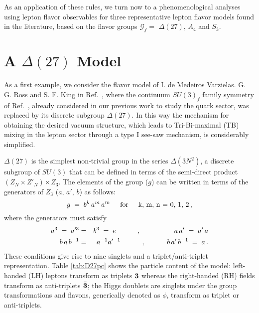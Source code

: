 \documentclass[a4paper,11pt]{article}
\newcommand{\bea}{\begin{eqnarray}}
\newcommand{\beq}{\begin{equation}}
\newcommand{\eea}{\end{eqnarray}}
\newcommand{\eeq}{\end{equation}}
\newcommand{\nn}{\nonumber}
\begin{document}
As an application of these rules, we turn now to a phenomenological analyses using lepton flavor observables for three representative lepton flavor models found in the literature, based on the flavor groups $\mathcal{G}_f = $ $\Delta(27)$, $A_4$ and $S_3$.


\section{A $\Delta (27)$ Model} \label{del27model}

As a first example, we consider the flavor model of I. de Medeiros Varzielas. G. G. Ross and S. F. King in Ref.~\cite{deMedeirosVarzielas:2006fc}, where the continuum $SU(3)_f$ family symmetry of Ref.~\cite{deMedeirosVarzielas:2005ax}, already considered in our previous work to study the quark sector, was replaced by its discrete subgroup $\Delta(27)$. In this way the mechanism for obtaining the desired vacuum structure, which leads to  Tri-Bi-maximal (TB) mixing in the lepton sector through a type I see-saw mechanism, is considerably simplified.

$\Delta(27)$ is the simplest non-trivial group in the series $\Delta(3N^2)$, a discrete subgroup of $SU(3)$ that can be defined in terms of the semi-direct product $(Z_N\times Z'_N)\ltimes Z_3$. The elements of the group ($g$) can be written in terms of the generators of $Z_3$ ($a$, $a'$, $b$) as follows:
\beq
g \;=\; b^k\, a^m\, a'^n \hspace{0.5cm}{\rm for}\hspace{0.5cm} \mbox{k, m, n = 0, 1, 2}\, ,
\eeq
where the generators must satisfy
\bea
 a^3 \;=\; a'^3 & = & b^3 \;=\; e \hspace{1cm}\;,\;\hspace{1.6cm} a\,a' \;=\; a'\,a \nn \\
b\,a\,b^{-1} & = & a^{-1}a'^{-1} \hspace{1cm}\;,\;\hspace{1cm} b\,a'\,b^{-1} \;=\; a \, .
\eea
These conditions give rise to nine singlets and a triplet/anti-triplet representation. Table \ref{tab:D27pc} shows the particle content of the model: left-handed (LH) leptons transform as triplets $\bf 3$ whereas the right-handed (RH) fields transform as anti-triplets $\bar{\bf 3}$; the Higgs doublets are singlets under the group transformations and flavons, generically denoted as $\phi$, transform as triplet or anti-triplets.
\end{document}
